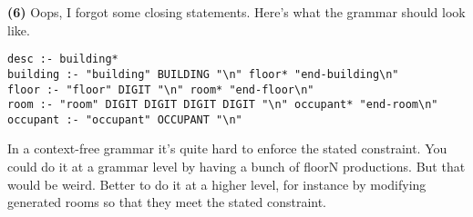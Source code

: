 \documentclass[11pt,onecolumn,letterpaper]{article}
\newcounter{qNum}
\newcommand{\q}[1]{%
\textbf{(#1)}\stepcounter{qNum}}
\begin{document}
\q{6} Oops, I forgot some closing statements. Here's what the grammar should look like.

\begin{verbatim}
desc :- building*
building :- "building" BUILDING "\n" floor* "end-building\n"
floor :- "floor" DIGIT "\n" room* "end-floor\n"
room :- "room" DIGIT DIGIT DIGIT DIGIT "\n" occupant* "end-room\n"
occupant :- "occupant" OCCUPANT "\n"
\end{verbatim}

In a context-free grammar it's quite hard to enforce the stated constraint. You could do it at a
grammar level by having a bunch of floorN productions. But that would be weird. Better to do it at a
higher level, for instance by modifying generated rooms so that they meet the stated constraint.
\end{document}
